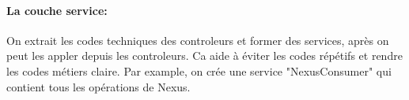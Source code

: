 \paragraph{La couche service:}
On extrait les codes techniques des controleurs et former des services, après on peut les appler depuis les controleurs. Ca aide à éviter les codes répétifs et rendre les codes métiers claire.
Par example, on crée une service "NexusConsumer" qui contient tous les opérations de Nexus.

\clearpage
